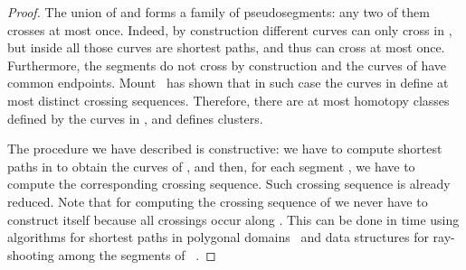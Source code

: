 \documentclass[11pt,a4paper]{article}
\begin{document}
\begin{proof}
The union of  and  forms a family of pseudosegments: any two of them crosses at most once.
Indeed, by construction different curves can only cross in , but inside  all those curves are shortest paths, and thus can cross at most once.
Furthermore, the segments  do not cross by construction and the curves of  have common endpoints.
Mount~\cite[Theorem 1.1]{mount-90} has shown that in such case the curves in  
define at most  distinct crossing sequences. Therefore, there are at most  homotopy classes defined
by the curves in , and  defines  clusters. 

The procedure we have described is constructive: we have to compute  shortest paths in  to obtain the curves of , and then, for each segment , we have to compute the corresponding crossing sequence. Such crossing sequence is already reduced. Note that for computing the crossing sequence of  we never have to construct  itself because all crossings occur along .
This can be done in  time using algorithms for shortest paths in polygonal domains~\cite{hs-oaesp-99} and data structures for ray-shooting among the segments of ~\cite{ray-shooting}.
\end{proof}
\end{document}
